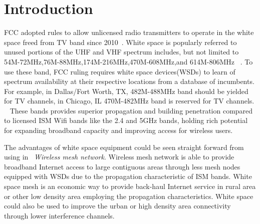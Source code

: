 \section{Introduction}
\label{sec:introduction}

FCC adopted rules to allow unlicensed radio transmitters to operate in the white space freed from TV band since 2010~\cite{fccwhitespace}. White space is popularly referred to unused portions of the UHF and VHF spectrum includes, but not limited to 54M-72MHz,76M-88MHz,174M-216MHz,470M-608MHz,and 614M-806MHz ~\cite{whitespacewiki}.
To use these band, FCC ruling requires white space devices(WSDs) to learn of spectrum availability at their respective locations from a database of incumbents. For example, in Dallas/Fort Worth, TX, 482M-488MHz band should be yielded for TV channels, in Chicago, IL 470M-482MHz band is reserved for TV channels. ~\cite{broadband}
 These bands provides superior propagation and building penetration compared to licensed ISM Wifi bands like the 2.4 and 5GHz bands, holding rich potential for expanding broadband capacity and improving access for wireless users.


The advantages of white space equipment could be seen straight forward from using in ~\emph{Wireless mesh network}.
Wireless mesh network is able to provide broadband Internet access to large contiguous areas through less mesh nodes equipped with WSDs due to the propagation characteristic of ISM bands. White space mesh is an economic way to provide back-haul Internet service in rural area or other low density area employing the propagation characteristics.
White space could also be used to improve the urban or high density area connectivity through lower interference channels. 

